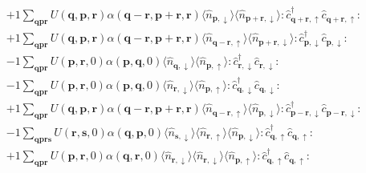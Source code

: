 \begin{align*}
	&+1 \sum_{ \mathbf{q} \mathbf{p} \mathbf{r} } U( \mathbf{q}, \mathbf{p}, \mathbf{r} )  \alpha( \mathbf{q}-\mathbf{r}, \mathbf{p}+\mathbf{r}, \mathbf{r} )   \langle \hat{n}_{ \mathbf{p}, \downarrow } \rangle \langle \hat{n}_{ \mathbf{p}+\mathbf{r}, \downarrow } \rangle :\hat{c}_{ \mathbf{q}+\mathbf{r}, \uparrow }^\dagger \hat{c}_{ \mathbf{q}+\mathbf{r}, \uparrow }^{\phantom{\dagger}}: \\
	&+1 \sum_{ \mathbf{q} \mathbf{p} \mathbf{r} } U( \mathbf{q}, \mathbf{p}, \mathbf{r} )  \alpha( \mathbf{q}-\mathbf{r}, \mathbf{p}+\mathbf{r}, \mathbf{r} )   \langle \hat{n}_{ \mathbf{q}-\mathbf{r}, \uparrow } \rangle \langle \hat{n}_{ \mathbf{p}+\mathbf{r}, \downarrow } \rangle :\hat{c}_{ \mathbf{p}, \downarrow }^\dagger \hat{c}_{ \mathbf{p}, \downarrow }^{\phantom{\dagger}}: \\
	&-1 \sum_{ \mathbf{q} \mathbf{p} \mathbf{r} } U( \mathbf{p}, \mathbf{r}, 0 )  \alpha( \mathbf{p}, \mathbf{q}, 0 )   \langle \hat{n}_{ \mathbf{q}, \downarrow } \rangle \langle \hat{n}_{ \mathbf{p}, \uparrow } \rangle :\hat{c}_{ \mathbf{r}, \downarrow }^\dagger \hat{c}_{ \mathbf{r}, \downarrow }^{\phantom{\dagger}}: \\
	&-1 \sum_{ \mathbf{q} \mathbf{p} \mathbf{r} } U( \mathbf{p}, \mathbf{r}, 0 )  \alpha( \mathbf{p}, \mathbf{q}, 0 )   \langle \hat{n}_{ \mathbf{r}, \downarrow } \rangle \langle \hat{n}_{ \mathbf{p}, \uparrow } \rangle :\hat{c}_{ \mathbf{q}, \downarrow }^\dagger \hat{c}_{ \mathbf{q}, \downarrow }^{\phantom{\dagger}}: \\
	&+1 \sum_{ \mathbf{q} \mathbf{p} \mathbf{r} } U( \mathbf{q}, \mathbf{p}, \mathbf{r} )  \alpha( \mathbf{q}-\mathbf{r}, \mathbf{p}+\mathbf{r}, \mathbf{r} )   \langle \hat{n}_{ \mathbf{q}-\mathbf{r}, \uparrow } \rangle \langle \hat{n}_{ \mathbf{p}, \downarrow } \rangle :\hat{c}_{ \mathbf{p}-\mathbf{r}, \downarrow }^\dagger \hat{c}_{ \mathbf{p}-\mathbf{r}, \downarrow }^{\phantom{\dagger}}: \\
	&-1 \sum_{ \mathbf{q} \mathbf{p} \mathbf{r} \mathbf{s} } U( \mathbf{r}, \mathbf{s}, 0 )  \alpha( \mathbf{q}, \mathbf{p}, 0 )   \langle \hat{n}_{ \mathbf{s}, \downarrow } \rangle \langle \hat{n}_{ \mathbf{r}, \uparrow } \rangle \langle \hat{n}_{ \mathbf{p}, \downarrow } \rangle :\hat{c}_{ \mathbf{q}, \uparrow }^\dagger \hat{c}_{ \mathbf{q}, \uparrow }^{\phantom{\dagger}}: \\
	&+1 \sum_{ \mathbf{q} \mathbf{p} \mathbf{r} } U( \mathbf{p}, \mathbf{r}, 0 )  \alpha( \mathbf{q}, \mathbf{r}, 0 )   \langle \hat{n}_{ \mathbf{r}, \downarrow } \rangle \langle \hat{n}_{ \mathbf{r}, \downarrow } \rangle \langle \hat{n}_{ \mathbf{p}, \uparrow } \rangle :\hat{c}_{ \mathbf{q}, \uparrow }^\dagger \hat{c}_{ \mathbf{q}, \uparrow }^{\phantom{\dagger}}: \\

\end{align*}
